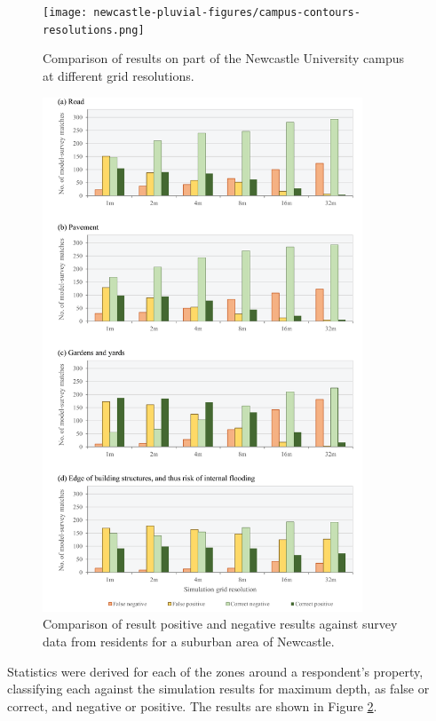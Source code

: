\begin{figure}[tpb]
	\centering
	\texttt{[image: newcastle-pluvial-figures/campus-contours-resolutions.png]}
	\caption{Comparison of results on part of the Newcastle University campus at different grid resolutions.}
	\label{Newcastle_Pluvial_CampusContours}
\end{figure}
\begin{figure}[p]
	\centering
	\includegraphics[width=0.85\textwidth]{newcastle-pluvial-figures/survey-matches.png}
	\caption{Comparison of result positive and negative results against survey data from residents for a suburban area of Newcastle.}
	\label{Newcastle_Pluvial_ResidentSurveyStats}
\end{figure}

Statistics were derived for each of the zones around a respondent's property, classifying each against the simulation results for maximum depth, as false or correct, and negative or positive. The results are shown in Figure \ref{Newcastle_Pluvial_ResidentSurveyStats}.

